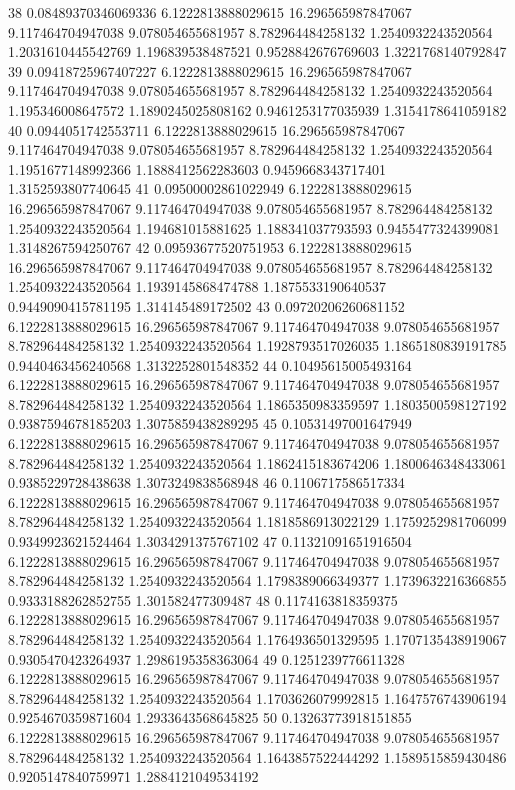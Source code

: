 {38 0.08489370346069336 6.1222813888029615 16.296565987847067 9.117464704947038 9.078054655681957 8.782964484258132 1.2540932243520564 1.2031610445542769 1.196839538487521 0.9528842676769603 1.3221768140792847
39 0.09418725967407227 6.1222813888029615 16.296565987847067 9.117464704947038 9.078054655681957 8.782964484258132 1.2540932243520564 1.195346008647572 1.1890245025808162 0.9461253177035939 1.3154178641059182
40 0.0944051742553711 6.1222813888029615 16.296565987847067 9.117464704947038 9.078054655681957 8.782964484258132 1.2540932243520564 1.1951677148992366 1.1888412562283603 0.9459668343717401 1.3152593807740645
41 0.09500002861022949 6.1222813888029615 16.296565987847067 9.117464704947038 9.078054655681957 8.782964484258132 1.2540932243520564 1.194681015881625 1.188341037793593 0.9455477324399081 1.3148267594250767
42 0.09593677520751953 6.1222813888029615 16.296565987847067 9.117464704947038 9.078054655681957 8.782964484258132 1.2540932243520564 1.1939145868474788 1.1875533190640537 0.9449090415781195 1.314145489172502
43 0.09720206260681152 6.1222813888029615 16.296565987847067 9.117464704947038 9.078054655681957 8.782964484258132 1.2540932243520564 1.1928793517026035 1.1865180839191785 0.9440463456240568 1.3132252801548352
44 0.10495615005493164 6.1222813888029615 16.296565987847067 9.117464704947038 9.078054655681957 8.782964484258132 1.2540932243520564 1.1865350983359597 1.1803500598127192 0.9387594678185203 1.3075859438289295
45 0.10531497001647949 6.1222813888029615 16.296565987847067 9.117464704947038 9.078054655681957 8.782964484258132 1.2540932243520564 1.1862415183674206 1.1800646348433061 0.9385229728438638 1.3073249838568948
46 0.1106717586517334 6.1222813888029615 16.296565987847067 9.117464704947038 9.078054655681957 8.782964484258132 1.2540932243520564 1.1818586913022129 1.1759252981706099 0.9349923621524464 1.3034291375767102
47 0.11321091651916504 6.1222813888029615 16.296565987847067 9.117464704947038 9.078054655681957 8.782964484258132 1.2540932243520564 1.1798389066349377 1.1739632216366855 0.9333188262852755 1.301582477309487
48 0.1174163818359375 6.1222813888029615 16.296565987847067 9.117464704947038 9.078054655681957 8.782964484258132 1.2540932243520564 1.1764936501329595 1.1707135438919067 0.9305470423264937 1.2986195358363064
49 0.1251239776611328 6.1222813888029615 16.296565987847067 9.117464704947038 9.078054655681957 8.782964484258132 1.2540932243520564 1.1703626079992815 1.1647576743906194 0.9254670359871604 1.2933643568645825
50 0.13263773918151855 6.1222813888029615 16.296565987847067 9.117464704947038 9.078054655681957 8.782964484258132 1.2540932243520564 1.1643857522444292 1.1589515859430486 0.9205147840759971 1.2884121049534192
}
